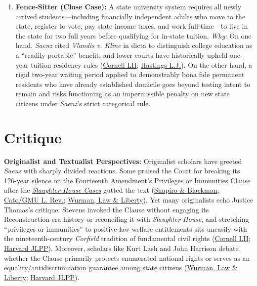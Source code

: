 \documentclass[12pt]{article}
\begin{document}
\begin{enumerate}
\item \textbf{Fence-Sitter (Close Case):} A state university system requires all newly arrived students---including financially independent adults who move to the state, register to vote, pay state income taxes, and work full-time---to live in the state for two full years before qualifying for in-state tuition. \emph{Why:} On one hand, \textit{Saenz} cited \textit{Vlandis v. Kline} in dicta to distinguish college education as a ``readily portable'' benefit, and lower courts have historically upheld one-year tuition residency rules (\href{https://www.law.cornell.edu/supremecourt/text/98-97}{Cornell LII}; \href{https://repository.uclawsf.edu/cgi/viewcontent.cgi?article=3500&context=hastings_law_journal}{Hastings L.J.}). On the other hand, a rigid two-year waiting period applied to demonstrably bona fide permanent residents who have already established domicile goes beyond testing intent to remain and risks functioning as an impermissible penalty on new state citizens under \textit{Saenz}'s strict categorical rule.
\end{enumerate}

\section{Critique}

\textbf{Originalist and Textualist Perspectives:} Originalist scholars have greeted \textit{Saenz} with sharply divided reactions. Some praised the Court for breaking its 126-year silence on the Fourteenth Amendment's Privileges or Immunities Clause after the \href{https://www.law.cornell.edu/supremecourt/text/83/36}{\textit{Slaughter-House Cases}} gutted the text (\href{https://www.cato.org/sites/cato.org/files/2020-04/shapiro-blackman-gmlr-priv-imm-clause.pdf}{Shapiro \& Blackman, Cato/GMU L. Rev.}; \href{https://lawliberty.org/forum/reversing-the-legacy-of-slaughter-house/}{Wurman, Law \& Liberty}). Yet many originalists echo Justice Thomas's critique: Stevens invoked the Clause without engaging its Reconstruction-era history or reconciling it with \textit{Slaughter-House}, and stretching ``privileges or immunities'' to positive-law welfare entitlements sits uneasily with the nineteenth-century \textit{Corfield} tradition of fundamental civil rights (\href{https://www.law.cornell.edu/supct/html/98-97.ZD1.html}{Cornell LII}; \href{https://journals.law.harvard.edu/jlpp/wp-content/uploads/sites/90/2026/03/30_23HarvJLPubPoly2951999-2000.pdf}{Harvard JLPP}). Moreover, scholars like Kurt Lash and John Harrison debate whether the Clause primarily protects enumerated national rights or serves as an equality/antidiscrimination guarantee among state citizens (\href{https://lawliberty.org/forum/reversing-the-legacy-of-slaughter-house/}{Wurman, Law \& Liberty}; \href{https://journals.law.harvard.edu/jlpp/wp-content/uploads/sites/90/2026/03/30_23HarvJLPubPoly2951999-2000.pdf}{Harvard JLPP}).
\end{document}
